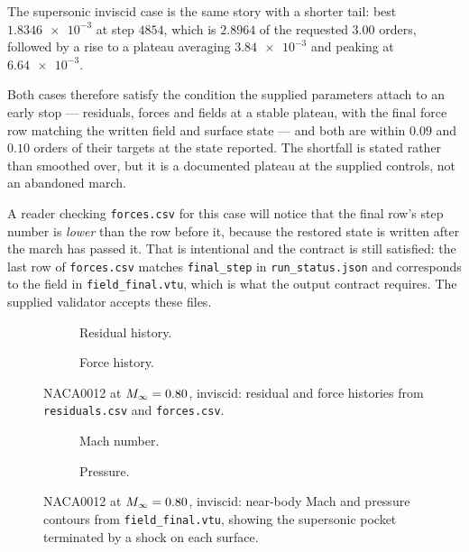 The supersonic inviscid case is the same story with a shorter tail: best $\num{1.8346e-3}$
at step $4854$, which is $2.8964$ of the requested $3.00$ orders, followed by a rise to a
plateau averaging $\num{3.84e-3}$ and peaking at $\num{6.64e-3}$.

Both cases therefore satisfy the condition the supplied parameters attach to an early
stop --- residuals, forces and fields at a stable plateau, with the final force row
matching the written field and surface state --- and both are within $0.09$ and $0.10$
orders of their targets at the state reported. The shortfall is stated rather than
smoothed over, but it is a documented plateau at the supplied controls, not an
abandoned march.

A reader checking \texttt{forces.csv} for this case will notice that the final row's step
number is \emph{lower} than the row before it, because the restored state is written after
the march has passed it. That is intentional and the contract is still satisfied: the last
row of \texttt{forces.csv} matches \texttt{final\_step} in \texttt{run\_status.json} and
corresponds to the field in \texttt{field\_final.vtu}, which is what the output contract
requires. The supplied validator accepts these files.

\begin{figure}[htbp]
  \centering
  \begin{subfigure}{0.49\textwidth}\centering
    \caption{Residual history.}
  \end{subfigure}\hfill
  \begin{subfigure}{0.49\textwidth}\centering
    \caption{Force history.}
  \end{subfigure}
  \caption{NACA0012 at $M_\infty=0.80$, inviscid: residual and force histories from
  \texttt{residuals.csv} and \texttt{forces.csv}.}
  \label{fig:naca080inv-hist}
\end{figure}

\begin{figure}[htbp]
  \centering
  \begin{subfigure}{0.49\textwidth}\centering
    \caption{Mach number.}
  \end{subfigure}\hfill
  \begin{subfigure}{0.49\textwidth}\centering
    \caption{Pressure.}
  \end{subfigure}
  \caption{NACA0012 at $M_\infty=0.80$, inviscid: near-body Mach and pressure
  contours from \texttt{field\_final.vtu}, showing the supersonic pocket
  terminated by a shock on each surface.}
  \label{fig:naca080inv-field}
\end{figure}

